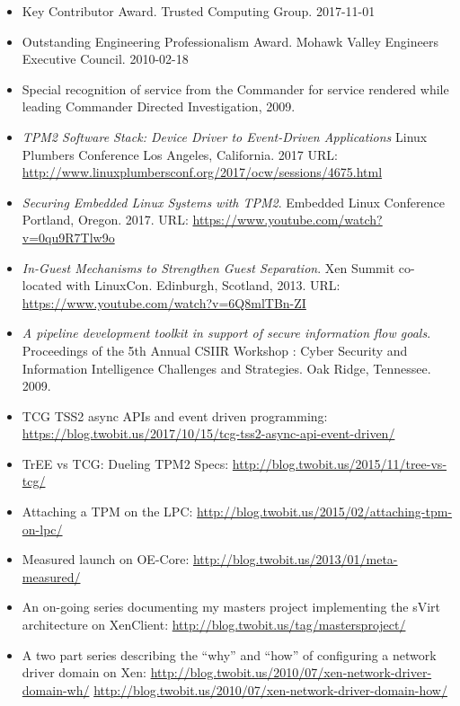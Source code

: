 \documentclass[letterpaper,11pt]{article}
\begin{document}
    \begin {itemize}
      \setlength {\itemsep}{1pt}
      \setlength {\parskip}{0pt}
      \setlength {\parsep}{0pt}
    \item Key Contributor Award.
      Trusted Computing Group.
      2017-11-01
    \item Outstanding Engineering Professionalism Award.
      Mohawk Valley Engineers Executive Council.
      2010-02-18
    \item Special recognition of service from the Commander for service
      rendered while leading Commander Directed Investigation, 2009.
    \end {itemize}

    \begin{itemize}
    \item {\it TPM2 Software Stack: Device Driver to Event-Driven Applications}
      Linux Plumbers Conference
      Los Angeles, California.
      2017
      URL: \url {http://www.linuxplumbersconf.org/2017/ocw/sessions/4675.html}
    \item {\it Securing Embedded Linux Systems with TPM2}.
      Embedded Linux Conference
      Portland, Oregon.
      2017.
      URL: \url {https://www.youtube.com/watch?v=0qu9R7Tlw9o}
    \item {\it In-Guest Mechanisms to Strengthen Guest Separation}.
      Xen Summit co-located with LinuxCon.
      Edinburgh, Scotland,
      2013.
      URL: \url {https://www.youtube.com/watch?v=6Q8mlTBn-ZI}
    \item {\it A pipeline development toolkit in support of secure information flow goals}.
      Proceedings of the 5th Annual CSIIR Workshop : Cyber Security and Information Intelligence Challenges and Strategies.
      Oak Ridge, Tennessee.
      2009.
    \end{itemize}
    \begin {itemize}
      \setlength {\itemsep}{1pt}
      \setlength {\parskip}{0pt}
      \setlength {\parsep}{0pt}
    \item TCG TSS2 async APIs and event driven programming:
      \url {https://blog.twobit.us/2017/10/15/tcg-tss2-async-api-event-driven/}
    \item TrEE vs TCG: Dueling TPM2 Specs:
      \url {http://blog.twobit.us/2015/11/tree-vs-tcg/}
    \item Attaching a TPM on the LPC:
      \url {http://blog.twobit.us/2015/02/attaching-tpm-on-lpc/}
    \item Measured launch on OE-Core:
      \url {http://blog.twobit.us/2013/01/meta-measured/}
    \item An on-going series documenting my masters project implementing the sVirt architecture on XenClient:
      \url {http://blog.twobit.us/tag/mastersproject/}
    \item A two part series describing the ``why'' and ``how'' of configuring a network driver domain on Xen:
      \url {http://blog.twobit.us/2010/07/xen-network-driver-domain-wh/}
      \url {http://blog.twobit.us/2010/07/xen-network-driver-domain-how/}
    \end {itemize}
\end{document}
